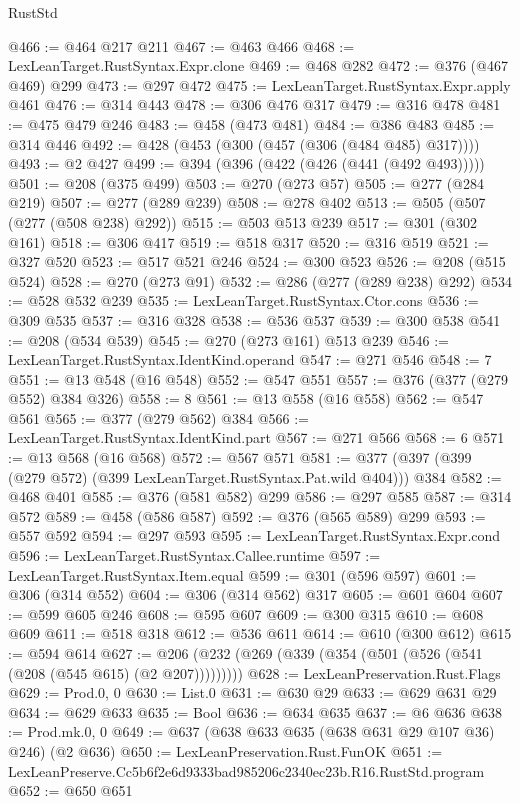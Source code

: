 \begin{lexlean}{RustStd}
\begin{coremodule}
@466 := @464 @217 @211
@467 := @463 @466
@468 := LexLeanTarget.RustSyntax.Expr.clone
@469 := @468 @282
@472 := @376 (@467 @469) @299
@473 := @297 @472
@475 := LexLeanTarget.RustSyntax.Expr.apply @461
@476 := @314 @443
@478 := @306 @476 @317
@479 := @316 @478
@481 := @475 @479 @246
@483 := @458 (@473 @481)
@484 := @386 @483
@485 := @314 @446
@492 := @428 (@453 (@300 (@457 (@306 (@484 @485) @317))))
@493 := @2 @427
@499 := @394 (@396 (@422 (@426 (@441 (@492 @493)))))
@501 := @208 (@375 @499)
@503 := @270 (@273 @57)
@505 := @277 (@284 @219)
@507 := @277 (@289 @239)
@508 := @278 @402
@513 := @505 (@507 (@277 (@508 @238) @292))
@515 := @503 @513 @239
@517 := @301 (@302 @161)
@518 := @306 @417
@519 := @518 @317
@520 := @316 @519
@521 := @327 @520
@523 := @517 @521 @246
@524 := @300 @523
@526 := @208 (@515 @524)
@528 := @270 (@273 @91)
@532 := @286 (@277 (@289 @238) @292)
@534 := @528 @532 @239
@535 := LexLeanTarget.RustSyntax.Ctor.cons
@536 := @309 @535
@537 := @316 @328
@538 := @536 @537
@539 := @300 @538
@541 := @208 (@534 @539)
@545 := @270 (@273 @161) @513 @239
@546 := LexLeanTarget.RustSyntax.IdentKind.operand
@547 := @271 @546
@548 := 7
@551 := @13 @548 (@16 @548)
@552 := @547 @551
@557 := @376 (@377 (@279 @552) @384 @326)
@558 := 8
@561 := @13 @558 (@16 @558)
@562 := @547 @561
@565 := @377 (@279 @562) @384
@566 := LexLeanTarget.RustSyntax.IdentKind.part
@567 := @271 @566
@568 := 6
@571 := @13 @568 (@16 @568)
@572 := @567 @571
@581 := @377 (@397 (@399 (@279 @572) (@399 LexLeanTarget.RustSyntax.Pat.wild @404))) @384
@582 := @468 @401
@585 := @376 (@581 @582) @299
@586 := @297 @585
@587 := @314 @572
@589 := @458 (@586 @587)
@592 := @376 (@565 @589) @299
@593 := @557 @592
@594 := @297 @593
@595 := LexLeanTarget.RustSyntax.Expr.cond
@596 := LexLeanTarget.RustSyntax.Callee.runtime
@597 := LexLeanTarget.RustSyntax.Item.equal
@599 := @301 (@596 @597)
@601 := @306 (@314 @552)
@604 := @306 (@314 @562) @317
@605 := @601 @604
@607 := @599 @605 @246
@608 := @595 @607
@609 := @300 @315
@610 := @608 @609
@611 := @518 @318
@612 := @536 @611
@614 := @610 (@300 @612)
@615 := @594 @614
@627 := @206 (@232 (@269 (@339 (@354 (@501 (@526 (@541 (@208 (@545 @615) (@2 @207)))))))))
@628 := LexLeanPreservation.Rust.Flags
@629 := Prod.{0, 0}
@630 := List.{0}
@631 := @630 @29
@633 := @629 @631 @29
@634 := @629 @633
@635 := Bool
@636 := @634 @635
@637 := @6 @636
@638 := Prod.mk.{0, 0}
@649 := @637 (@638 @633 @635 (@638 @631 @29 @107 @36) @246) (@2 @636)
@650 := LexLeanPreservation.Rust.FunOK
@651 := LexLeanPreserve.Cc5b6f2e6d9333bad985206c2340ec23b.R16.RustStd.program
@652 := @650 @651

\end{coremodule}
\end{lexlean}
